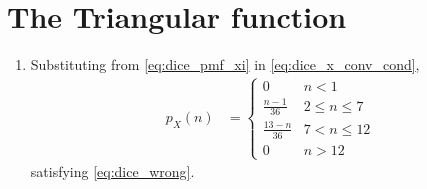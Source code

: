 \documentclass[journal,12pt,twocolumn]{IEEEtran}
\renewcommand\thesection{\arabic{section}}
\begin{document}
\section{The Triangular function}
\begin{enumerate}[label=\thesection.\arabic*.,ref=\thesection.\theenumi]
	\item Substituting from \eqref{eq:dice_pmf_xi} in \eqref{eq:dice_x_conv_cond},
\begin{align}
p_X(n) &= 
\begin{cases}
0 & n < 1
\\
\frac{n-1}{36} &  2 \le n \le  7
\\
\frac{13-n}{36} & 7 < n \le 12
\\
0 & n > 12
\end{cases}
\label{eq:dice_x_conv_final}
\end{align}
satisfying \eqref{eq:dice_wrong}.
\end{enumerate}
\end{document}
